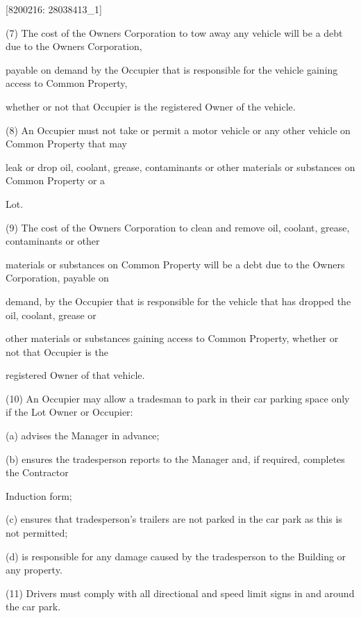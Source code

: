 \documentclass{article}
\begin{document}
{\fontsize{7.02}{1}[8200216: 28038413\_1] }


{\fontsize{9.962}{1}(7) The cost of the Owners Corporation to tow away any vehicle will be a debt due to the Owners Corporation, }

{\fontsize{10.02}{1}payable on demand by the Occupier that is responsible for the vehicle gaining access to Common Property, }

{\fontsize{10.02}{1}whether or not that Occupier is the registered Owner of the vehicle. }

{\fontsize{9.962}{1}(8) An Occupier must not take or permit a motor vehicle or any other vehicle on Common Property that may }

{\fontsize{10.02}{1}leak or drop oil, coolant, grease, contaminants or other materials or substances on Common Property or a }

{\fontsize{10.02}{1}Lot. }

{\fontsize{9.962}{1}(9) The cost of the Owners Corporation to clean and remove oil, coolant, grease, contaminants or other }

{\fontsize{10.02}{1}materials or substances on Common Property will be a debt due to the Owners Corporation, payable on }

{\fontsize{10.02}{1}demand, by the Occupier that is responsible for the vehicle that has dropped the oil, coolant, grease or }

{\fontsize{10.02}{1}other materials or substances gaining access to Common Property, whether or not that Occupier is the }

{\fontsize{10.02}{1}registered Owner of that vehicle. }

{\fontsize{9.962}{1}(10) An Occupier may allow a tradesman to park in their car parking space only if the Lot Owner or Occupier: }

{\fontsize{9.962}{1}(a) advises the Manager in advance; }

{\fontsize{9.962}{1}(b) ensures the tradesperson reports to the Manager and, if required, completes the Contractor }

{\fontsize{10.02}{1}Induction form; }

{\fontsize{9.962}{1}(c) ensures that tradesperson’s trailers are not parked in the car park as this is not permitted; }

{\fontsize{9.962}{1}(d) is responsible for any damage caused by the tradesperson to the Building or any property. }

{\fontsize{9.962}{1}(11) Drivers must comply with all directional and speed limit signs in and around the car park. }
\end{document}
